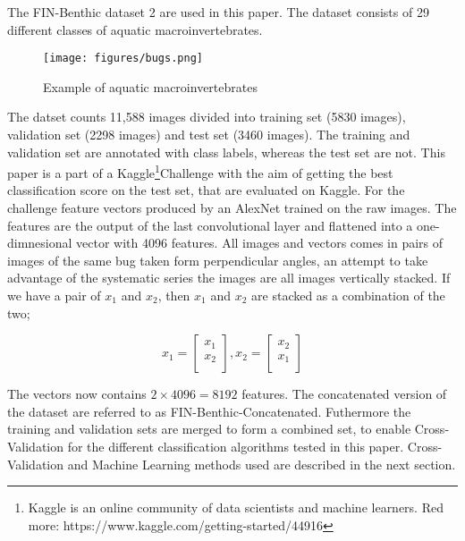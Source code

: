 The FIN-Benthic \cite{finbenthic} dataset 2 are used in this paper. The dataset consists of 29 different classes of aquatic macroinvertebrates. 

\begin{figure}[H]
    \centering
    \texttt{[image: figures/bugs.png]}
    \caption{Example of aquatic macroinvertebrates}
\end{figure}

The datset counts 11,588 images divided into training set (5830 images), validation set (2298 images) and test set (3460 images). The training and validation set are annotated with class labels, whereas the test set are not. This paper is a part of a Kaggle\footnote{Kaggle is an online community of data scientists and machine learners. Red more: https://www.kaggle.com/getting-started/44916}Challenge with the aim of getting the best classification score on the test set, that are evaluated on Kaggle. For the challenge feature vectors produced by an AlexNet\cite{Krizhevsky:2012} trained on the raw images. The features are the output of the last convolutional layer and flattened into a one-dimnesional vector with 4096 features. All images and vectors comes in pairs of images of the same bug taken form perpendicular angles, an attempt to take advantage of the systematic series the images are all images vertically stacked. If we have a pair of $x_1$ and $x_2$, then $x_1$ and $x_2$ are stacked as a combination of the two; 

$$x_1=\begin{bmatrix} x_{1} \\ x_{2} \\ \end{bmatrix}, x_2 = \begin{bmatrix} x_{2} \\ x_{1} \\ \end{bmatrix}$$

The vectors now contains $2 \times 4096 = 8192$ features. The concatenated version of the dataset are referred to as FIN-Benthic-Concatenated. Futhermore the training and validation sets are merged to form a combined set, to enable Cross-Validation for the different classification algorithms tested in this paper. Cross-Validation and Machine Learning methods used are described in the next section.